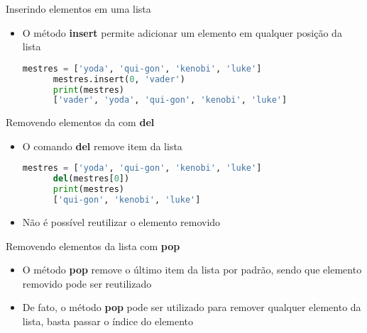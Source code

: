 %
\begin{frame}[t, fragile]{Inserindo elementos em uma lista}
  \begin{itemize}
    \item O método {\bf insert} permite adicionar um elemento em qualquer posição da lista
    \begin{lstlisting}[language=python]
      mestres = ['yoda', 'qui-gon', 'kenobi', 'luke']
      mestres.insert(0, 'vader')
      print(mestres)
      ['vader', 'yoda', 'qui-gon', 'kenobi', 'luke']
    \end{lstlisting} 
  \end{itemize}
\end{frame}
%
\begin{frame}[t, fragile]{Removendo elementos da com {\bf del}}
  \begin{itemize}
    \item O comando {\bf del} remove item da lista 
    \begin{lstlisting}[language=python]
      mestres = ['yoda', 'qui-gon', 'kenobi', 'luke']
      del(mestres[0])
      print(mestres)
      ['qui-gon', 'kenobi', 'luke']
    \end{lstlisting} 
    \item Não é possível reutilizar o elemento removido
  \end{itemize}
\end{frame}
%
\begin{frame}[t, fragile]{Removendo elementos da lista com {\bf pop}}
  \begin{itemize}
    \item O método {\bf pop} remove o último item da lista por padrão, sendo que elemento removido pode ser reutilizado
    
    \item De fato, o método {\bf pop} pode ser utilizado para remover qualquer elemento da lista, basta passar o índice do elemento
    
  \end{itemize}
  
\end{frame}
%
%      
